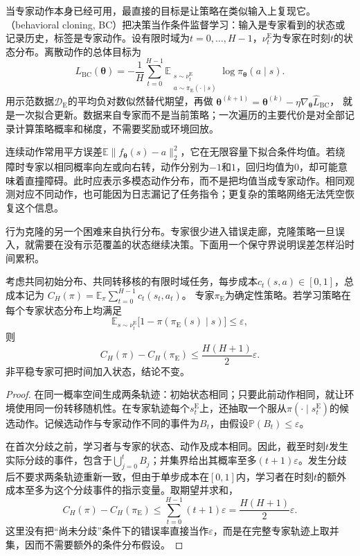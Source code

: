 当专家动作本身已经可用，最直接的目标是让策略在类似输入上复现它。（behavioral cloning, BC）把决策当作条件监督学习：输入是专家看到的状态或记录历史，标签是专家动作。设有限时域为$t=0,\ldots,H-1$，$\nu_t^{\mathrm E}$为专家在时刻$t$的状态分布。离散动作的总体目标为
\begin{equation}
  L_{\mathrm{BC}}(\bm{\theta})
  =-\frac1H\sum_{t=0}^{H-1}
  \mathbb E_{\substack{s\sim\nu_t^{\mathrm E}\\
              a\sim\pi_{\mathrm E}(\cdot\mid s)}}
       \log\pi_{\bm{\theta}}(a\mid s).
  \label{eq:rl-reward-bc}
\end{equation}
用示范数据$\mathcal D_{\mathrm E}$的平均负对数似然替代期望，再做
$\bm{\theta}^{(k+1)}=\bm{\theta}^{(k)}
-\eta\nabla_{\bm{\theta}}\widehat L_{\mathrm{BC}}$，
就是一次拟合更新。数据来自专家而不是当前策略；一次遍历的主要代价是对全部记录计算策略概率和梯度，不需要奖励或环境回放。

连续动作常用平方误差$\mathbb E\lVert f_{\bm{\theta}}(s)-a\rVert_2^2$，它在无限容量下拟合条件均值。若绕障时专家以相同概率向左或向右转，动作分别为$-1$和$1$，回归均值为$0$，却可能意味着直撞障碍。此时应表示多模态动作分布，而不是把均值当成专家动作。相同观测对应不同动作，也可能因为日志漏记了任务指令；更复杂的策略网络无法凭空恢复这个信息。

行为克隆的另一个困难来自执行分布。专家很少进入错误走廊，克隆策略一旦误入，就需要在没有示范覆盖的状态继续决策。下面用一个保守界说明误差怎样沿时间累积。

\begin{theorem}[行为克隆的首次分歧界]
  \label{thm:rl-reward-bc}
  考虑共同初始分布、共同转移核的有限时域任务，每步成本$c_t(s,a)\in[0,1]$，总成本记为
  $C_H(\pi)=\mathbb E_\pi\sum_{t=0}^{H-1}c_t(s_t,a_t)$。
  专家$\pi_{\mathrm E}$为确定性策略。若学习策略在每个专家状态分布上均满足
  \[
    \mathbb E_{s\sim\nu_t^{\mathrm E}}
    \bigl[1-\pi(\pi_{\mathrm E}(s)\mid s)\bigr]\leq\varepsilon,
  \]
  则
  \[
    C_H(\pi)-C_H(\pi_{\mathrm E})
    \leq \frac{H(H+1)}2\varepsilon.
  \]
  非平稳专家可把时间加入状态，结论不变。
\end{theorem}

\begin{proof}
  在同一概率空间生成两条轨迹：初始状态相同；只要此前动作相同，就让环境使用同一份转移随机性。在专家轨迹每个$s_t^{\mathrm E}$上，还抽取一个服从$\pi(\cdot\mid s_t^{\mathrm E})$的候选动作。记候选动作与专家动作不同的事件为$B_t$，由假设$\mathbb P(B_t)\leq\varepsilon$。

  在首次分歧之前，学习者与专家的状态、动作及成本相同。因此，截至时刻$t$发生实际分歧的事件，包含于$\bigcup_{j=0}^{t}B_j$；并集界给出其概率至多$(t+1)\varepsilon$。发生分歧后不要求两条轨迹重新一致，但由于单步成本在$[0,1]$内，学习者在时刻$t$的额外成本至多为这个分歧事件的指示变量。取期望并求和，
  \[
    C_H(\pi)-C_H(\pi_{\mathrm E})
    \leq\sum_{t=0}^{H-1}(t+1)\varepsilon
    =\frac{H(H+1)}2\varepsilon.
  \]
  这里没有把“尚未分歧”条件下的错误率直接当作$\varepsilon$，而是在完整专家轨迹上取并集，因而不需要额外的条件分布假设。
\end{proof}

